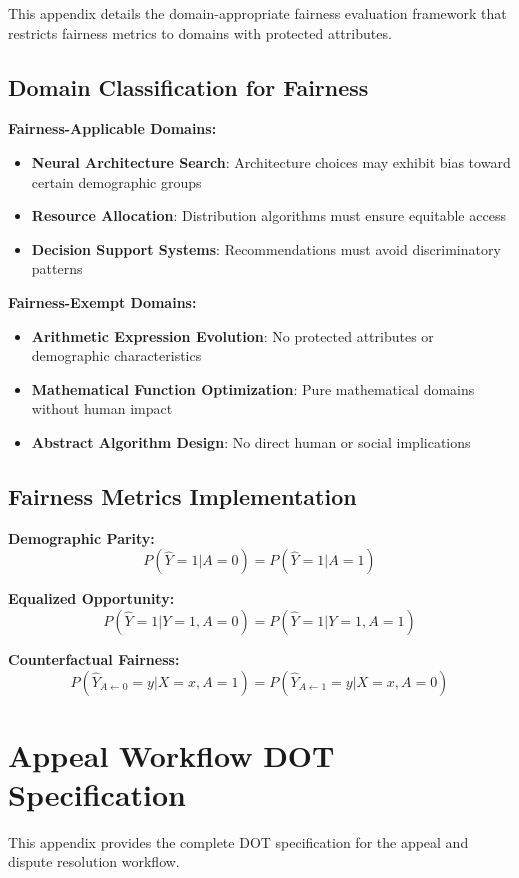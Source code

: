 \documentclass[sigconf,natbib]{acmart}
\begin{document}
This appendix details the domain-appropriate fairness evaluation framework that restricts fairness metrics to domains with protected attributes.

\subsection{Domain Classification for Fairness}
\textbf{Fairness-Applicable Domains:}
\begin{itemize}
    \item \textbf{Neural Architecture Search}: Architecture choices may exhibit bias toward certain demographic groups
    \item \textbf{Resource Allocation}: Distribution algorithms must ensure equitable access
    \item \textbf{Decision Support Systems}: Recommendations must avoid discriminatory patterns
\end{itemize}

\textbf{Fairness-Exempt Domains:}
\begin{itemize}
    \item \textbf{Arithmetic Expression Evolution}: No protected attributes or demographic characteristics
    \item \textbf{Mathematical Function Optimization}: Pure mathematical domains without human impact
    \item \textbf{Abstract Algorithm Design}: No direct human or social implications
\end{itemize}

\subsection{Fairness Metrics Implementation}
\textbf{Demographic Parity:}
$$P(\hat{Y} = 1 | A = 0) = P(\hat{Y} = 1 | A = 1)$$

\textbf{Equalized Opportunity:}
$$P(\hat{Y} = 1 | Y = 1, A = 0) = P(\hat{Y} = 1 | Y = 1, A = 1)$$

\textbf{Counterfactual Fairness:}
$$P(\hat{Y}_{A \leftarrow 0} = y | X = x, A = 1) = P(\hat{Y}_{A \leftarrow 1} = y | X = x, A = 0)$$

\section{Appeal Workflow DOT Specification}
\label{app:appeal_dot_code}

This appendix provides the complete DOT specification for the appeal and dispute resolution workflow.
\end{document}
